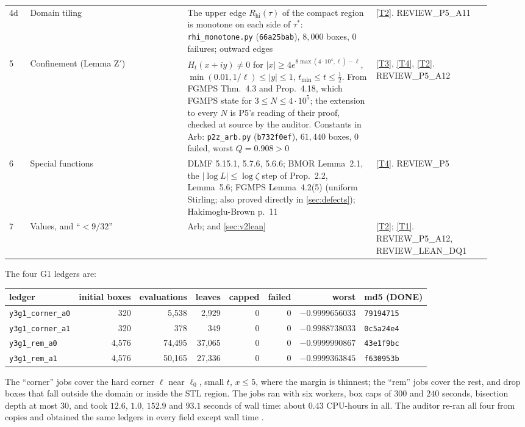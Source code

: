 \documentclass[11pt]{article}
\theoremstyle{definition}
\newcommand{\lean}[1]{\texttt{#1}}
\begin{document}
\begin{center}
\begin{longtable}{@{}P{0.04\linewidth}P{0.30\linewidth}P{0.36\linewidth}P{0.22\linewidth}@{}}
4d & Domain tiling & The upper edge $R_{\mathrm{hi}}(\tau)$ of the compact region is monotone on each side of $\tau^*$: \lean{rhi\_monotone.py} (\lean{66a25bab}), $8{,}000$ boxes, $0$ failures; outward edges & \ref{T2}. REVIEW\_P5\_A11 \\
5 & Confinement (Lemma Z$'$) & $H_t(x+iy) \ne 0$ for $|x| \ge 4e^{8\max(4\cdot10^4,\ell) - \ell}$, $\min(0.01, 1/\ell) \le |y| \le 1$, $t_{\min} \le t \le \tfrac12$. From FGMPS Thm.~4.3 and Prop.~4.18, which FGMPS state for $3 \le N \le 4\cdot10^5$; the extension to every $N$ is P5's reading of their proof, checked at source by the auditor. Constants in Arb: \lean{p2z\_arb.py} (\lean{b732f0ef}), $61{,}440$ boxes, $0$ failed, worst $Q = 0.908 > 0$ & \ref{T3}, \ref{T4}, \ref{T2}. REVIEW\_P5\_A12 \\
6 & Special functions & DLMF 5.15.1, 5.7.6, 5.6.6; BMOR Lemma~2.1, the $|\log L| \le \log\zeta$ step of Prop.~2.2, Lemma~5.6; FGMPS Lemma~4.2(5) (uniform Stirling; also proved directly in \cref{sec:defects}); Hakimoglu-Brown p.~11 & \ref{T4}. REVIEW\_P5 \\
7 & Values, and ``$< 9/32$'' & Arb; and \cref{sec:v2lean} & \ref{T2}; \ref{T1}. REVIEW\_P5\_A12, REVIEW\_LEAN\_DQ1 \\
\bottomrule
\end{longtable}
\end{center}

\noindent
The four G1 ledgers are:
\begin{center}\small
\begin{tabular}{@{}lrrrrrrl@{}}
\toprule
ledger & initial boxes & evaluations & leaves & capped & failed & worst & md5 (DONE) \\
\midrule
\lean{y3g1\_corner\_a0} & 320 & 5,538 & 2,929 & 0 & 0 & $-0.9999656033$ & \lean{79194715} \\
\lean{y3g1\_corner\_a1} & 320 & 378 & 349 & 0 & 0 & $-0.9988738033$ & \lean{0c5a24e4} \\
\lean{y3g1\_rem\_a0} & 4,576 & 74,495 & 37,065 & 0 & 0 & $-0.9999990867$ & \lean{43e1f9bc} \\
\lean{y3g1\_rem\_a1} & 4,576 & 50,165 & 27,336 & 0 & 0 & $-0.9999363845$ & \lean{f630953b} \\
\bottomrule
\end{tabular}
\end{center}
The ``corner'' jobs cover the hard corner $\ell$ near $\ell_0$, small $t$, $x \le 5$, where the margin is thinnest; the ``rem'' jobs cover the rest, and drop boxes that fall outside the domain or inside the STL region. The jobs ran with six workers, box caps of $300$ and $240$ seconds, bisection depth at most $30$, and took $12.6$, $1.0$, $152.9$ and $93.1$ seconds of wall time: about $0.43$ CPU-hours in all. The auditor re-ran all four from copies and obtained the same ledgers in every field except wall time \cite[REVIEW\_Y3\_G1]{dq1records}.
\end{document}
